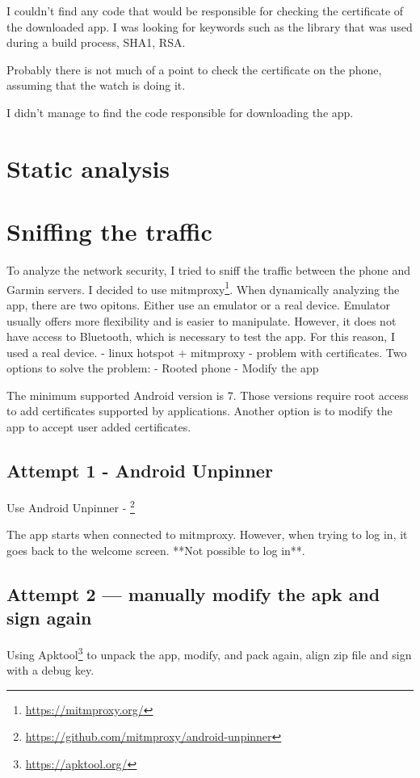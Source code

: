 I couldn't find any code that would be responsible for checking the certificate of the downloaded app.
I was looking for keywords such as the library that was used during a build process, SHA1, RSA\@.

Probably there is not much of a point to check the certificate on the phone, assuming that the watch is doing it.

I didn't manage to find the code responsible for downloading the app.
\section{Static analysis}

\section{Sniffing the traffic}
To analyze the network security, I tried to sniff the traffic between the phone and Garmin servers.
I decided to use mitmproxy\footnote{\url{https://mitmproxy.org/}}.
When dynamically analyzing the app, there are two opitons.
Either use an emulator or a real device.
Emulator usually offers more flexibility and is easier to manipulate.
However, it does not have access to Bluetooth, which is necessary to test the app.
For this reason, I used a real device.
- linux hotspot + mitmproxy - problem with certificates.
Two options to solve the problem:
- Rooted phone
- Modify the app

The minimum supported Android version is 7.
Those versions require root access to add certificates supported by applications.
Another option is to modify the app to accept user added certificates.

\subsection*{Attempt 1 - Android Unpinner}
Use Android Unpinner - \footnote{\url{https://github.com/mitmproxy/android-unpinner}}

The app starts when connected to mitmproxy.
However, when trying to log in, it goes back to the welcome screen.
**Not possible to log in**.

\subsection*{Attempt 2 — manually modify the apk and sign again}

Using Apktool\footnote{\url{https://apktool.org/}} to unpack the app, modify, and pack again, align zip file and sign with a debug key.

